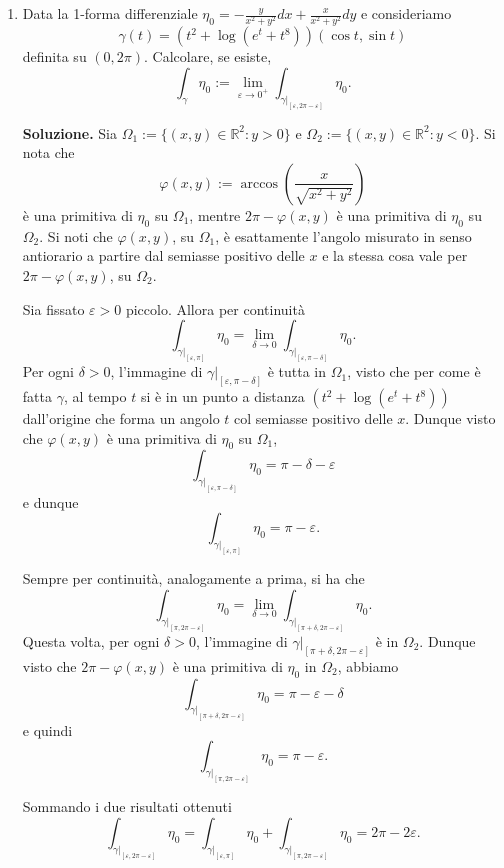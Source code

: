 \begin{enumerate}
	
	\item Data la 1-forma differenziale $\eta_0 = -\frac{y}{x^2 + y^2} dx + \frac{x}{x^2 + y^2} dy$ e consideriamo
	\[
	\gamma(t) = \left(t^2 + \log \left(e^t + t^8\right)\right) (\cos t, \sin t)
	\]
	definita su $(0, 2\pi)$. Calcolare, se esiste,
	\[
	\int_{\gamma} \eta_0 := \lim_{\varepsilon \to 0^+} \int_{\left.\gamma\right|_{[\varepsilon, 2\pi - \varepsilon]}} \eta_0.
	\]
	
	\textbf{Soluzione.}
		Sia $\Omega_1 := \{(x,y) \in \mathbb{R}^2 : y > 0\}$ e $\Omega_2 := \{(x,y) \in \mathbb{R}^2 : y < 0\}$. Si nota che
		\[
		\varphi(x,y) := \arccos \left(\frac{x}{\sqrt{x^2 + y^2}}\right)
		\]
		è una primitiva di $\eta_0$ su $\Omega_1$, mentre $2\pi - \varphi(x,y)$ è una primitiva di $\eta_0$ su $\Omega_2$. Si noti che $\varphi(x,y)$, su $\Omega_1$, è esattamente l'angolo misurato in senso antiorario a partire dal semiasse positivo delle $x$ e la stessa cosa vale per $2\pi - \varphi(x,y)$, su $\Omega_2$.
		
		Sia fissato $\varepsilon > 0$ piccolo. Allora per continuità
		\[
		\int_{\left.\gamma\right|_{[\varepsilon, \pi]}} \eta_0 = \lim_{\delta \to 0} \int_{\left.\gamma\right|_{[\varepsilon, \pi - \delta]}} \eta_0.
		\]
		Per ogni $\delta > 0$, l'immagine di $\left.\gamma\right|_{[\varepsilon, \pi - \delta]}$ è tutta in $\Omega_1$, visto che per come è fatta $\gamma$, al tempo $t$ si è in un punto a distanza $\left(t^2 + \log \left(e^t + t^8\right)\right)$ dall'origine che forma un angolo $t$ col semiasse positivo delle $x$. Dunque visto che $\varphi(x,y)$ è una primitiva di $\eta_0$ su $\Omega_1$,
		\[
		\int_{\left.\gamma\right|_{[\varepsilon, \pi - \delta]}} \eta_0 = \pi - \delta - \varepsilon
		\]
		e dunque
		\[
		\int_{\left.\gamma\right|_{[\varepsilon, \pi]}} \eta_0 = \pi - \varepsilon.
		\]
		
		Sempre per continuità, analogamente a prima, si ha che
		\[
		\int_{\left.\gamma\right|_{[\pi, 2\pi - \varepsilon]}} \eta_0 = \lim_{\delta \to 0} \int_{\left.\gamma\right|_{[\pi + \delta, 2\pi - \varepsilon]}} \eta_0.
		\]
		Questa volta, per ogni $\delta > 0$, l'immagine di $\left.\gamma\right|_{[\pi + \delta, 2\pi - \varepsilon]}$ è in $\Omega_2$. Dunque visto che $2\pi - \varphi(x,y)$ è una primitiva di $\eta_0$ in $\Omega_2$, abbiamo
		\[
		\int_{\left.\gamma\right|_{[\pi + \delta, 2\pi - \varepsilon]}} \eta_0 = \pi - \varepsilon - \delta
		\]
		e quindi
		\[
		\int_{\left.\gamma\right|_{[\pi, 2\pi - \varepsilon]}} \eta_0 = \pi - \varepsilon.
		\]
		
		Sommando i due risultati ottenuti
		\[
		\int_{\left.\gamma\right|_{[\varepsilon, 2\pi - \varepsilon]}} \eta_0 = \int_{\left.\gamma\right|_{[\varepsilon, \pi]}} \eta_0 + \int_{\left.\gamma\right|_{[\pi, 2\pi - \varepsilon]}} \eta_0 = 2\pi - 2\varepsilon.
		\]
		

\end{enumerate}
